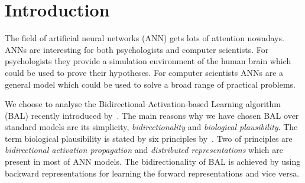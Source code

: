 
\section*{Introduction}
\label{sec:introduction} 


The field of artificial neural networks (ANN) gets lots of attention nowadays. ANNs are interesting for both psychologists and computer scientists. For psychologists they provide a simulation environment of the human brain which could be used to prove their hypotheses. For computer scientists ANNs are a general model which could be used to solve a broad range of practical problems. 





\label{sec:motivation} 
We choose to analyse the Bidirectional Activation-based Learning algorithm (BAL) recently introduced by~\citet{farkas2013bal}. The main reasons why we have chosen BAL over standard models are its simplicity, \emph{bidirectionality} and \emph{biological plausibility}. The term biological plausibility is stated by six principles by~\citet{hinton1988learning}. Two of principles are \emph{bidirectional activation propagation} and \emph{distributed representations} which are present in most of ANN models. The bidirectionality of BAL is achieved by using backward representations for learning the forward representations and vice versa. 

